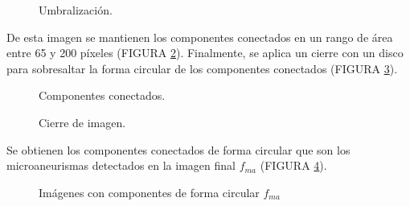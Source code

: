  \begin{figure}[H]
\centering
{}
\caption{Umbralización.} \label{fig:sec_ma_6}
\end{figure}
 
 De esta imagen se mantienen los componentes conectados en un rango de área entre 65 y 200 píxeles (FIGURA \ref{fig:sec_ma_7}).  Finalmente, se aplica un cierre con un disco para sobresaltar la forma circular de los componentes conectados (FIGURA \ref{fig:sec_ma_8}).
 
 \begin{figure}[H]
\centering
{}
\caption{Componentes conectados.} \label{fig:sec_ma_7}
\end{figure}
 


 \begin{figure}[H]
\centering
{}
\caption{Cierre de imagen.} \label{fig:sec_ma_8}
\end{figure} 
 
Se obtienen los componentes conectados de forma circular que son los microaneurismas detectados en  la imagen final $f_{ma}$ (FIGURA \ref{fig:sec_ma_9}).

 \begin{figure}[H]
\centering
{}
\caption{Imágenes con componentes de forma circular $f_{ma}$} \label{fig:sec_ma_9}
\end{figure}

